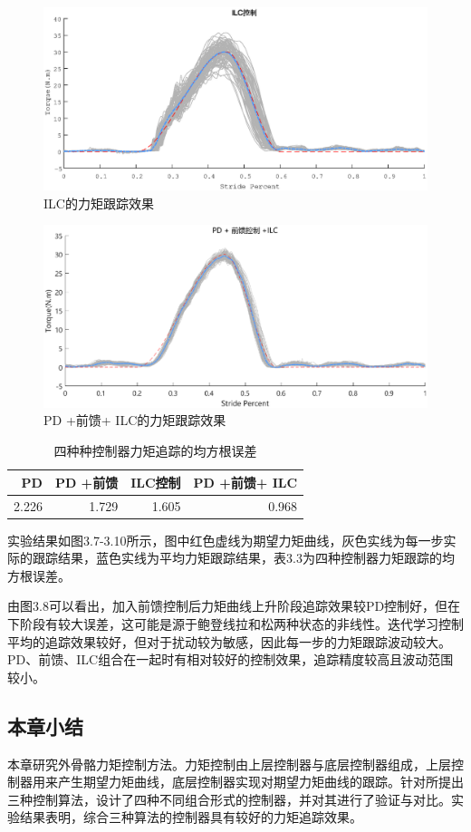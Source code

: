 \begin{figure}[!htb]
    \includegraphics[width=17cm]{fig/f58.eps}
    \caption{ILC的力矩跟踪效果}
    \label{fig:mark}
\end{figure}
\begin{figure}[!htb]
    \includegraphics[width=17cm]{fig/f59.eps}
    \caption{PD +前馈+ ILC的力矩跟踪效果}
    \label{fig:mark}
\end{figure}

\begin{table}[htb]
    \caption[控制参数]{四种种控制器力矩追踪的均方根误差}
    \begin{tabular}{rrrr}
      \toprule
        PD & PD +前馈 & ILC控制 & PD +前馈+ ILC \\
      \midrule
        2.226 & 1.729 & 1.605 & 0.968 \\
      \bottomrule
    \end{tabular}
\end{table}

实验结果如图3.7-3.10所示，图中红色虚线为期望力矩曲线，灰色实线为每一步实际的跟踪结果，蓝色实线为平均力矩跟踪结果，表3.3为四种控制器力矩跟踪的均方根误差。

由图3.8可以看出，加入前馈控制后力矩曲线上升阶段追踪效果较PD控制好，但在下阶段有较大误差，这可能是源于鲍登线拉和松两种状态的非线性。迭代学习控制平均的追踪效果较好，但对于扰动较为敏感，因此每一步的力矩跟踪波动较大。PD、前馈、ILC组合在一起时有相对较好的控制效果，追踪精度较高且波动范围较小。

\subsection{本章小结}

本章研究外骨骼力矩控制方法。力矩控制由上层控制器与底层控制器组成，上层控制器用来产生期望力矩曲线，底层控制器实现对期望力矩曲线的跟踪。针对所提出三种控制算法，设计了四种不同组合形式的控制器，并对其进行了验证与对比。实验结果表明，综合三种算法的控制器具有较好的力矩追踪效果。